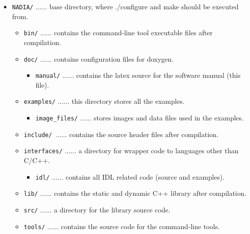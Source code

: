 \documentclass[]{nadia}
\begin{document}
\begin{itemize}
   \item[] {\tt NADIA/} ...... base directory, where ./configure and make should be executed from.
   \begin{itemize}
      \item[] {\tt bin/} ...... contains the command-line tool executable files after compilation.
      \item[] {\tt doc/} ...... contains configuration files for doxygen.
      \begin{itemize}
         \item[] {\tt manual/} ...... contains the latex source for the software manual (this file).
      \end{itemize}
      \item[] {\tt examples/} ...... this directory stores all the examples.
      \begin{itemize}
         \item[] {\tt image\_files/} ...... stores images and data files used in the examples.
      \end{itemize}
      \item[] {\tt include/ }...... contains the source header files after compilation.
      \item[] {\tt interfaces/} ...... a directory for wrapper code to languages other than C/C++.
      \begin{itemize}
         \item[] {\tt idl/} ...... contains all IDL related code (source and examples).
      \end{itemize}
      \item[] {\tt lib/} ...... contains the static and dynamic C++ library after compilation.
      \item[] {\tt src/} ...... a directory for the library source code.
      \item[] {\tt tools/} ...... contains the source code for the command-line tools.
   \end{itemize}
\end{itemize}



\end{document}

